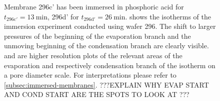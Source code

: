 \documentclass[../../../thesis.tex]{subfiles}
\begin{document}
\begin{figure}[tpb]
{      \label{fig:immersion_cond_zoom}
    }
    \caption{Membrane 296c' has been immersed in phosphoric acid for $t_\mathrm{296c'}=\SI{13}{\minute}$, 296d' for $t_\mathrm{296d'}=\SI{26}{\minute}$. \protect{} shows the isotherms of the immersion experiment conducted using wafer 296. The shift to larger pressures of the beginning of the evaporation branch and the unmoving beginning of the condensation branch are clearly visible. \protect{} and \protect{} are higher resolution plots of the relevant areas of the evaporation and respectively condensation branch of the isotherm on a pore diameter scale.  For interpretations please refer to \cref{subsec:immersed-membranes}. ???EXPLAIN WHY EVAP START AND COND START ARE THE SPOTS TO LOOK AT ???}
  \end{figure}
\end{document}
